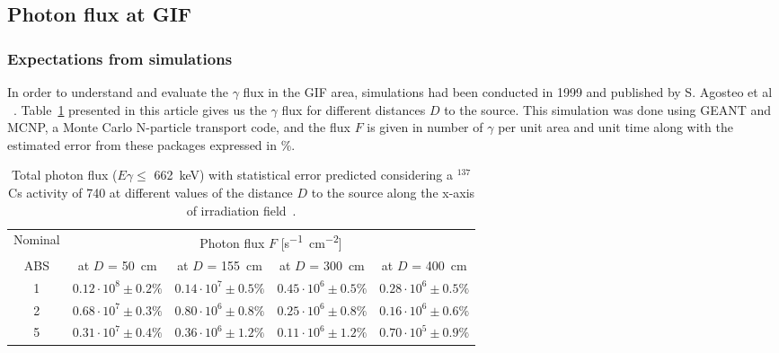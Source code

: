 	\subsection{Photon flux at GIF}
	\label{ssec:gFlux}
			
		\subsubsection{Expectations from simulations}
		\label{sssec:Simulations}
		
			In order to understand and evaluate the $\gamma$ flux in the GIF area, simulations had been conducted in 1999 and published by S. Agosteo et al ~\cite{AGOSTEO1999}. Table~\ref{tab:Sim1997} presented in this article gives us the $\gamma$ flux for different distances $D$ to the source. This simulation was done using GEANT and MCNP, a Monte Carlo N-particle transport code, and the flux $F$ is given in number of $\gamma$ per unit area and unit time along with the estimated error from these packages expressed in \%.
			
			\begin{table}[!h]
				\hspace*{-1.1cm}
				\begin{tabular}{|*{5}{c|}}
					\hline
					Nominal & \multicolumn{4}{c|}{Photon flux $F$ [\si{\second^{-1}\cm^{-2}}]} \\
					\cline{2-5}
					ABS & at $D$ = \SI{50}{\cm} & at $D$ = \SI{155}{\cm} & at $D$ = \SI{300}{\cm} & at $D$ = \SI{400}{\cm} \\
					\hline
					1 & $0.12 \cdot 10^8 \pm 0.2\%$ & $0.14 \cdot 10^7 \pm 0.5\%$ & $0.45 \cdot 10^6 \pm 0.5\%$ & $0.28 \cdot 10^6 \pm 0.5\%$ \\
					\hline
					2 & $0.68 \cdot 10^7 \pm 0.3\%$ & $0.80 \cdot 10^6 \pm 0.8\%$ & $0.25 \cdot 10^6 \pm 0.8\%$ & $0.16 \cdot 10^6 \pm 0.6\%$ \\
					\hline
					5 & $0.31 \cdot 10^7 \pm 0.4\%$ & $0.36 \cdot 10^6 \pm 1.2\%$ & $0.11 \cdot 10^6 \pm 1.2\%$ & $0.70 \cdot 10^5 \pm 0.9\%$ \\
					\hline
				\end{tabular}
				\caption{\label{tab:Sim1997} Total photon flux ($E\gamma \leq$ \SI{662}{\keV}) with statistical error predicted considering a $^{137}$Cs activity of \SI{740}{\GBq} at different values of the distance $D$ to the source along the x-axis of irradiation field~\cite{AGOSTEO1999}.}
			\end{table}
			
